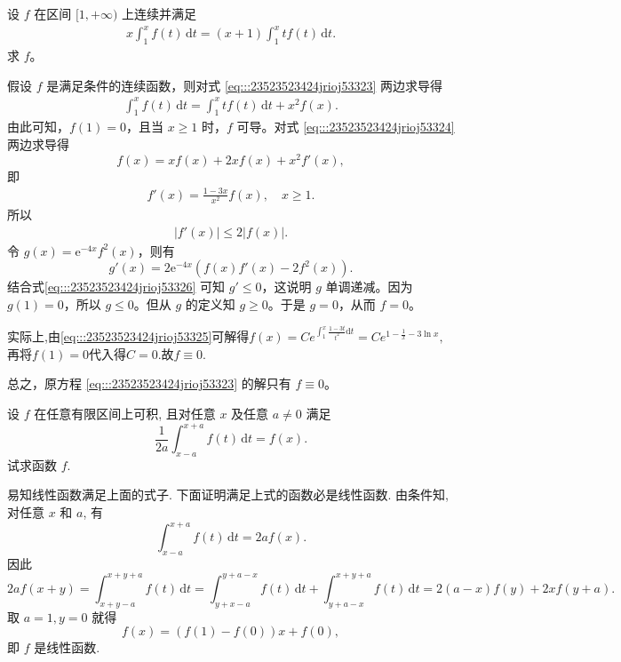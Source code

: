\documentclass[../../main.tex]{subfiles}%
\begin{document}
\begin{example}
设 \( f \) 在区间 \([1,+\infty)\) 上连续并满足
\begin{align}
x \int_{1}^{x} f(t) \, \mathrm{d}t = (x + 1) \int_{1}^{x} t f(t) \, \mathrm{d}t. \label{eq:::23523523424jrioj53323}
\end{align}
求 \( f \)。
\end{example}
\begin{solution}

假设 \( f \) 是满足条件的连续函数，则对式 \eqref{eq:::23523523424jrioj53323}  两边求导得
\begin{align}
\int_{1}^{x} f(t) \, \mathrm{d}t = \int_{1}^{x} t f(t) \, \mathrm{d}t + x^2 f(x). \label{eq:::23523523424jrioj53324}
\end{align}
由此可知，\( f(1) = 0 \)，且当 \( x \geqslant 1 \) 时，\( f \) 可导。对式 \eqref{eq:::23523523424jrioj53324} 两边求导得
\[
f(x) = x f(x) + 2x f(x) + x^2 f'(x),
\]
即
\begin{align}
f'(x) = \frac{1 - 3x}{x^2} f(x), \quad x \geqslant 1. \label{eq:::23523523424jrioj53325}
\end{align}
所以
\begin{align}
|f'(x)| \leqslant 2 |f(x)|. \label{eq:::23523523424jrioj53326}
\end{align}
令 \( g(x) = \mathrm{e}^{-4x} f^2(x) \)，则有
\[
g'(x) = 2 \mathrm{e}^{-4x} \left( f(x) f'(x) - 2 f^2(x) \right).
\]
结合式\eqref{eq:::23523523424jrioj53326} 可知 \( g' \leqslant 0 \)，这说明 \( g \) 单调递减。因为 \( g(1) = 0 \)，所以 \( g \leqslant 0 \)。但从 \( g \) 的定义知 \( g \geqslant 0 \)。于是 \( g = 0 \)，从而 \( f = 0 \)。

实际上,由\eqref{eq:::23523523424jrioj53325}可解得$f\left( x \right) =Ce^{\int_1^x{\frac{1-3t}{t^2}\mathrm{d}t}}=Ce^{1-\frac{1}{x}-3\ln x},$再将$f(1)=0$代入得$C=0.$故$f\equiv 0.$

总之，原方程 \eqref{eq:::23523523424jrioj53323} 的解只有 \( f \equiv 0 \)。

\end{solution}

\begin{example}
设 \( f \) 在任意有限区间上可积, 且对任意 \( x \) 及任意 \( a \neq 0 \) 满足
\[
\frac{1}{2a} \int_{x - a}^{x + a} f(t) \, \mathrm{d}t = f(x).
\]
试求函数 \( f \).
\end{example}
\begin{solution}

易知线性函数满足上面的式子. 下面证明满足上式的函数必是线性函数. 由条件知, 对任意 \( x \) 和 \( a \), 有
\[
\int_{x - a}^{x + a} f(t) \, \mathrm{d}t = 2a f(x).
\]
因此
\[
2a f(x + y) = \int_{x + y - a}^{x + y + a} f(t) \, \mathrm{d}t = \int_{y + x - a}^{y + a - x} f(t) \, \mathrm{d}t + \int_{y + a - x}^{x + y + a} f(t) \, \mathrm{d}t
= 2(a - x) f(y) + 2x f(y + a).
\]
取 \( a = 1, y = 0 \) 就得
\[
f(x) = (f(1) - f(0))x + f(0),
\]
即 \( f \) 是线性函数.

\end{solution}
\end{document}
